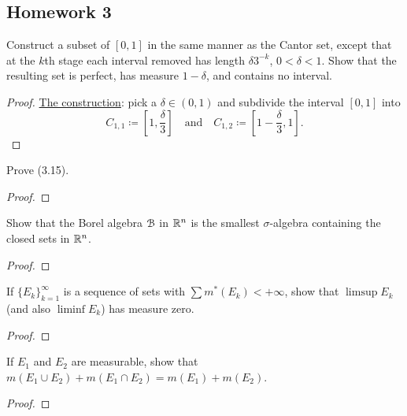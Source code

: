 \subsection{Homework 3}
\begin{problem}
  Construct a subset of $[0,1]$ in the same manner as the Cantor set,
  except that at the $k$th stage each interval removed has length
  $\delta 3^{-k}$, $0<\delta<1$. Show that the resulting set is perfect,
  has measure $1-\delta$, and contains no interval.
\end{problem}
\begin{proof}
\underline{The construction}: pick a $\delta\in(0,1)$ and subdivide the
interval $[0,1]$ into
\[
  C_{1,1}\coloneq\left[1,\frac{\delta}{3}\right]\quad\text{and}\quad
  C_{1,2}\coloneq\left[1-\frac{\delta}{3},1\right].
\]
\end{proof}

\begin{problem}
  Prove (3.15).
\end{problem}
\begin{proof}
\end{proof}

\begin{problem}
  Show that the Borel algebra $\mathcal{B}$ in $\mathbb{R}^n$ is the smallest
  $\sigma$-algebra containing the closed sets in $\mathbb{R}^n$.
\end{problem}
\begin{proof}
\end{proof}

\begin{problem}
  If ${\{E_k\}}_{k=1}^\infty$ is a sequence of sets with
  $\sum m^*(E_k)<+\infty$, show that $\limsup E_k$ (and also $\liminf E_k$)
  has measure zero.
\end{problem}
\begin{proof}
\end{proof}

\begin{problem}
  If $E_1$ and $E_2$ are measurable, show that
  $m(E_1\cup E_2)+m(E_1\cap E_2)=m(E_1)+m(E_2)$.
\end{problem}
\begin{proof}
\end{proof}

